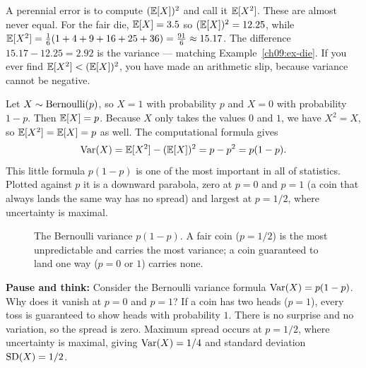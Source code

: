 \begin{trapbox}
A perennial error is to compute $(\operatorname{\mathbb{E}}[X])^2$ and call it $\operatorname{\mathbb{E}}[X^2]$. These are
almost never equal. For the fair die, $\operatorname{\mathbb{E}}[X]=3.5$ so $(\operatorname{\mathbb{E}}[X])^2 = 12.25$,
while $\operatorname{\mathbb{E}}[X^2] = \tfrac16(1+4+9+16+25+36) = \tfrac{91}{6} \approx 15.17$. The
difference $15.17 - 12.25 = 2.92$ is the variance --- matching
Example~\ref{ch09:ex-die}. If you ever find $\operatorname{\mathbb{E}}[X^2] < (\operatorname{\mathbb{E}}[X])^2$, you have
made an arithmetic slip, because variance cannot be negative.
\end{trapbox}

\begin{example}
\label{ch09:ex-bern}
Let $X \sim \operatorname{Bernoulli}(p)$, so $X=1$ with probability $p$ and $X=0$ with
probability $1-p$. Then $\operatorname{\mathbb{E}}[X] = p$. Because $X$ only takes the values $0$ and
$1$, we have $X^2 = X$, so $\operatorname{\mathbb{E}}[X^2] = \operatorname{\mathbb{E}}[X] = p$ as well. The computational
formula gives
\[
  \operatorname{Var}(X) = \operatorname{\mathbb{E}}[X^2] - (\operatorname{\mathbb{E}}[X])^2 = p - p^2 = p(1-p).
\]
This little formula $p(1-p)$ is one of the most important in all of
statistics. Plotted against $p$ it is a downward parabola, zero at $p=0$ and
$p=1$ (a coin that always lands the same way has no spread) and largest at
$p=1/2$, where uncertainty is maximal.
\end{example}

\begin{figure}[H]
\centering
{}
\caption{The Bernoulli variance $p(1-p)$. A fair coin ($p=1/2$) is the most
unpredictable and carries the most variance; a coin guaranteed to land one
way ($p=0$ or $1$) carries none.}
\label{ch09:fig-bern}
\end{figure}

\begin{recoverybox}
\textbf{Pause and think:} Consider the Bernoulli variance formula $\operatorname{Var}(X) = p(1-p)$.
Why does it vanish at $p=0$ and $p=1$? If a coin has two heads ($p=1$), every toss is
guaranteed to show heads with probability $1$. There is no surprise and no variation,
so the spread is zero. Maximum spread occurs at $p=1/2$, where uncertainty is maximal,
giving $\operatorname{Var}(X) = 1/4$ and standard deviation $\operatorname{SD}(X) = 1/2$.
\end{recoverybox}

